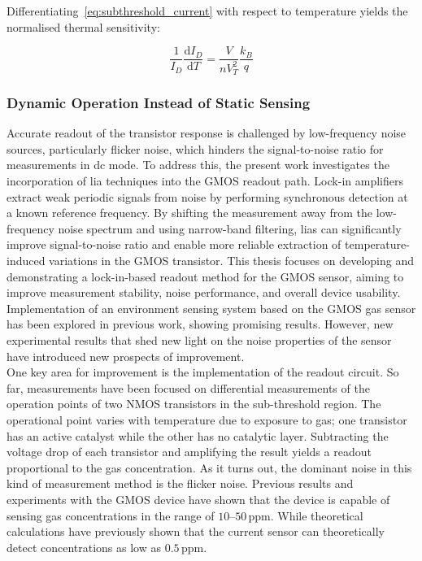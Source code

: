 Differentiating~\eqref{eq:subthreshold_current} with respect to temperature
yields the normalised thermal sensitivity:

\begin{equation}
  \frac{1}{I_D}\frac{\mathrm{d}I_D}{\mathrm{d}T} = \frac{V}{nV_T^2}\frac{k_B}{q}
  \label{eq:thermal_sensitivity}
\end{equation}

\subsubsection{Dynamic Operation Instead of Static Sensing}
Accurate readout of the transistor response is challenged by low-frequency
noise sources, particularly flicker noise, which hinders the signal-to-noise
ratio for measurements in \gls{dc} mode. To address this, the present work
investigates the incorporation of \gls{lia} techniques into the GMOS readout
path. Lock-in amplifiers extract weak periodic signals from noise by performing
synchronous detection at a known reference frequency. By shifting the
measurement away from the low-frequency noise spectrum and using narrow-band
filtering, \glspl{lia} can significantly improve signal-to-noise ratio and
enable more reliable extraction of temperature-induced variations in the GMOS
transistor. This thesis focuses on developing and demonstrating a lock-in-based
readout method for the GMOS sensor, aiming to improve measurement stability,
noise performance, and overall device usability.  Implementation of an
environment sensing system based on the GMOS gas sensor has been explored in
previous work, showing promising results. However, new experimental results
that shed new light on the noise properties of the sensor have introduced new
prospects of improvement. \\
One key area for improvement is the implementation of the readout circuit. So
far, measurements have been focused on differential measurements of the
operation points of two NMOS transistors in the sub-threshold region. The
operational point varies with temperature due to exposure to gas; one
transistor has an active catalyst while the other has no catalytic layer.
Subtracting the voltage drop of each transistor and amplifying the result
yields a readout proportional to the gas concentration. As it turns out, the
dominant noise in this kind of measurement method is the flicker noise.
Previous results and experiments with the GMOS device have shown that the
device is capable of sensing gas concentrations in the range of
$10$--$50\,\text{ppm}$. While theoretical calculations have previously shown
that the current sensor can theoretically detect concentrations as low as
$0.5\,\text{ppm}$.

